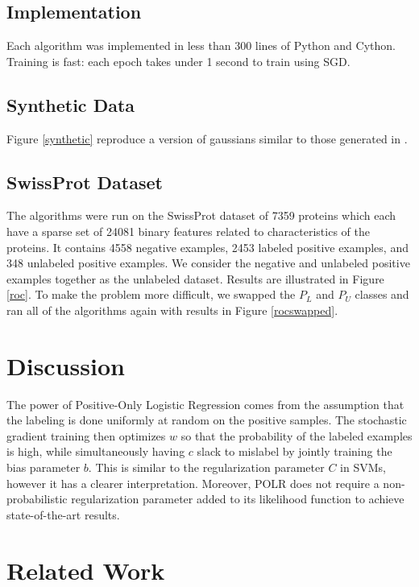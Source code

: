 \documentclass{article}
\begin{document}
\subsection{Implementation}

Each algorithm was implemented in less than 300 lines of Python and Cython. Training is fast: each epoch takes under 1 second to train using SGD.

\subsection{Synthetic Data}

Figure \ref{synthetic} reproduce a version of gaussians similar to those generated in \cite{elkan08}. 

\subsection{SwissProt Dataset}

The algorithms were run on the SwissProt \cite{elkan08} dataset of 7359 proteins which each have a sparse set of 24081 binary features related to characteristics of the proteins. It contains 4558 negative examples, 2453 labeled positive examples, and 348 unlabeled positive examples.   We consider the negative and unlabeled positive examples together as the unlabeled dataset. Results are illustrated in Figure \ref{roc}. To make the problem more difficult, we swapped the $P_L$ and $P_U$ classes and ran all of the algorithms again with results in Figure \ref{rocswapped}.

\section{Discussion}

The power of Positive-Only Logistic Regression comes from the assumption that the labeling is done uniformly at random on the positive samples.  The stochastic gradient training then optimizes $w$ so that the probability of the labeled examples is high, while simultaneously having $c$ slack to mislabel by jointly training the bias parameter $b$.  This is similar to the regularization parameter $C$ in SVMs, however it has a clearer interpretation.  Moreover, POLR does not require a non-probabilistic regularization parameter added to its likelihood function to achieve state-of-the-art results.

\section{Related Work}
\end{document}
